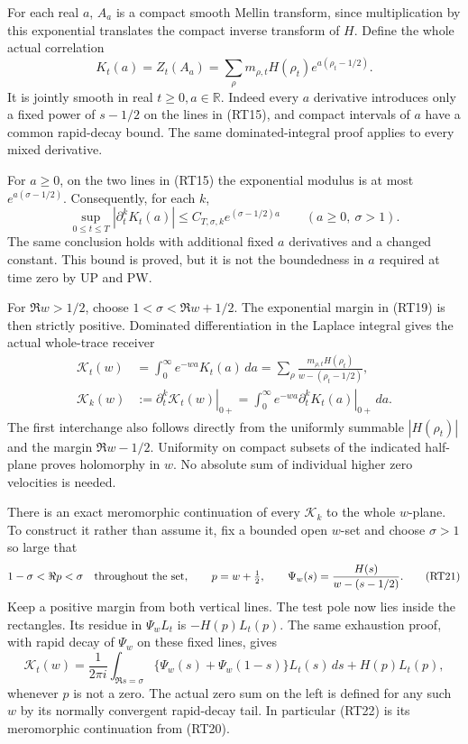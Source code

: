 \documentclass[
  10pt,
  a4paper,
]{article}
\begin{document}
For each real \(a\), \(A_a\) is a compact smooth Mellin transform, since
multiplication by this exponential translates the compact inverse
transform of \(H\). Define the whole actual correlation \[
K_t(a)=Z_t(A_a)=\sum_\rho m_{\rho,t}H(\rho_t)e^{a(\rho_t-1/2)}.
\tag{RT18}
\] It is jointly smooth in real \(t\ge0,a\in\mathbb R\). Indeed every
\(a\) derivative introduces only a fixed power of \(s-1/2\) on the lines
in (RT15), and compact intervals of \(a\) have a common rapid-decay
bound. The same dominated-integral proof applies to every mixed
derivative.

For \(a\ge0\), on the two lines in (RT15) the exponential modulus is at
most \(e^{a(\sigma-1/2)}\). Consequently, for each \(k\), \[
\sup_{0\le t\le T}|\partial_t^kK_t(a)|
\le C_{T,\sigma,k}e^{(\sigma-1/2)a}\qquad(a\ge0,\ \sigma>1).
\tag{RT19}
\] The same conclusion holds with additional fixed \(a\) derivatives and
a changed constant. This bound is proved, but it is not the boundedness
in \(a\) required at time zero by UP and PW.

For \(\Re w>1/2\), choose \(1<\sigma<\Re w+1/2\). The exponential margin
in (RT19) is then strictly positive. Dominated differentiation in the
Laplace integral gives the actual whole-trace receiver \[
\begin{aligned}
\mathscr K_t(w)&=\int_0^\infty e^{-wa}K_t(a)\,da
=\sum_\rho\frac{m_{\rho,t}H(\rho_t)}{w-(\rho_t-1/2)},\\
\mathscr K_k(w)&:=\left.\partial_t^k\mathscr K_t(w)\right|_{0+}
=\int_0^\infty e^{-wa}
\left.\partial_t^kK_t(a)\right|_{0+}\,da.
\end{aligned}\tag{RT20}
\] The first interchange also follows directly from the uniformly
summable \(|H(\rho_t)|\) and the margin \(\Re w-1/2\). Uniformity on
compact subsets of the indicated half-plane proves holomorphy in \(w\).
No absolute sum of individual higher zero velocities is needed.

There is an exact meromorphic continuation of every \(\mathscr K_k\) to
the whole \(w\)-plane. To construct it rather than assume it, fix a
bounded open \(w\)-set and choose \(\sigma>1\) so large that \[
1-\sigma<\Re p<\sigma\quad\hbox{throughout the set},\qquad
p=w+\tfrac12,\qquad \Psi_w(s)=\frac{H(s)}{w-(s-1/2)}.
\tag{RT21}
\] Keep a positive margin from both vertical lines. The test pole now
lies inside the rectangles. Its residue in \(\Psi_w L_t\) is
\(-H(p)L_t(p)\). The same exhaustion proof, with rapid decay of
\(\Psi_w\) on these fixed lines, gives \[
\mathscr K_t(w)=\frac1{2\pi i}\int_{\Re s=\sigma}
\{\Psi_w(s)+\Psi_w(1-s)\}L_t(s)\,ds+H(p)L_t(p),
\tag{RT22}
\] whenever \(p\) is not a zero. The actual zero sum on the left is
defined for any such \(w\) by its normally convergent rapid-decay tail.
In particular (RT22) is its meromorphic continuation from (RT20).
\end{document}
